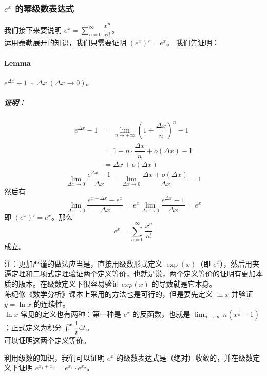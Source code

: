\documentclass[UTF8,12pt]{ctexart}
\begin{document}
        \subsubsection{$e^x$ 的幂级数表达式}
            我们接下来要说明 $e^x = \sum_{n = 0}^{\infty}\dfrac{x^n}{n!}$。\\
            运用泰勒展开的知识，我们只需要证明 $(e^x)' = e^x$。
            我们先证明：
            \paragraph{Lemma} $e^{\Delta x} - 1\sim \Delta x\ (\Delta x \to 0)$。
                \subparagraph{证明：}
                    $$
                    \begin{aligned}
                    e^{\Delta x} - 1 &= \lim_{n \to +\infty} (1 + \dfrac{\Delta x}{n})^n - 1\\
                    &= 1 + n\cdot \dfrac{\Delta x}{n} + o(\Delta x) - 1\\
                    &= \Delta x + o(\Delta x)
                    \end{aligned}
                    $$
                    $$
                    \lim_{\Delta x \to 0}\dfrac{e^{\Delta x} - 1}{\Delta x} = \lim_{\Delta x \to 0} \dfrac{\Delta x + o(\Delta x)}{\Delta x} = 1
                    $$
            然后有 $$
            \lim_{\Delta x \to 0}\dfrac{e^{x + \Delta x} - e^x}{\Delta x} = e^x \lim_{\Delta x \to 0} \dfrac{e^{\Delta x} - 1}{\Delta x} = e^x
            $$
            即 $(e^x)' = e^x$。那么 $$
            e^x = \sum_{n = 0}^{\infty}\dfrac{x^n}{n!}
            $$ 成立。

            注：更加严谨的做法应当是，直接用级数形式定义 $\exp(x)$（即 $e^x$），然后用夹逼定理和二项式定理验证两个定义等价，也就是说，两个定义等价的证明有更加本质的版本。在级数定义下很容易验证 $exp(x)$ 的导数就是它本身。\\
            陈纪修《数学分析》课本上采用的方法也是可行的，但是要先定义 $\ln x$ 并验证 $y = \ln x$ 的连续性。\\
            $\ln x$ 常见的定义也有两种：第一种是 $e^x$ 的反函数，也就是 $\lim_{n \to \infty} n(x^{\frac 1 n} - 1)$；正式定义为积分 $\int_{1}^{x} \dfrac 1 t {\rm d}t$。\\
            可以证明这两个定义等价。

            利用级数的知识，我们可以证明 $e^x$ 的级数表达式是（绝对）收敛的，并在级数定义下证明 $e^{x_1 + x_2} = e^{x_1}\cdot e^{x_2}$。\\
\end{document}
